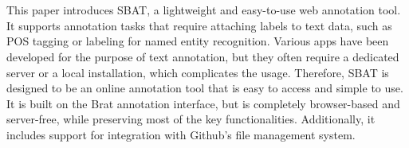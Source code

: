 \documentclass[12ptm a4paper]{article}
\begin{document}
% 
\newpage
\section*{}
This paper introduces SBAT, a lightweight and easy-to-use web annotation tool. It supports annotation tasks that require attaching labels to text data, such as POS tagging or labeling for named entity recognition. Various apps have been developed for the purpose of text annotation, but they often require a dedicated server or a local installation, which complicates the usage. Therefore, SBAT is designed to be an online annotation tool that is easy to access and simple to use. It is built on the Brat annotation interface, but is completely browser-based and server-free, while preserving most of the key functionalities. Additionally, it includes support for integration with Github's file management system.
\newpage
\tableofcontents
\newpage
{}
\end{document}
